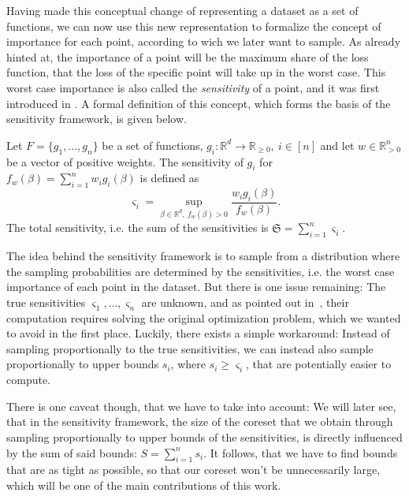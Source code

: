 Having made this conceptual change of representing a dataset as
a set of functions, we can now use this new representation to
formalize the concept of importance for each point, according
to wich we later want to sample.
As already hinted at, the importance of a point will be the
maximum share of the loss function, that the loss of the specific
point will take up in the worst case.
This worst case importance is also called the \textit{sensitivity}
of a point, and it was first introduced in
\cite{langberg-schulman-sensitivities}.
A formal definition of this concept, which forms
the basis of the sensitivity framework, is given below.

\begin{definition}
    \label{def:sensitivity}
    Let $F = \{ g_1, ..., g_n \}$ be a set of functions,
    $g_i: \mathbb{R}^d \rightarrow \mathbb{R}_{\geq 0}, \ i \in [n]$
    and let $w \in \mathbb{R}^n_{>0}$ be a vector of positive weights.
    The sensitivity of $g_i$ for $f_w(\beta) = \sum_{i=1}^n w_i g_i(\beta)$ is defined as
    \begin{equation*}
        \varsigma_i = \sup_{\beta \in \mathbb{R}^d, \ f_w(\beta) > 0} \frac{w_i g_i(\beta)}{f_w(\beta)}.
    \end{equation*}
    The total sensitivity, i.e. the sum of the sensitivities is $\mathfrak{S} = \sum_{i=1}^n \varsigma_i$.
\end{definition}

The idea behind the sensitivity framework is to sample from a
distribution where the sampling probabilities are determined by
the sensitivities, i.e. the worst case importance of each point
in the dataset.
But there is one issue remaining: The true sensitivities
$\varsigma_1, ..., \varsigma_n$ are unknown, and as
pointed out in~\cite{braverman-feldman-coresets}, their
computation requires solving the original optimization problem,
which we wanted to avoid in the first place.
Luckily, there exists a simple workaround:
Instead of sampling proportionally to the true sensitivities,
we can instead also sample proportionally to
upper bounds $s_i$, where $s_i \geq \varsigma_i$, that are
potentially easier to compute.

There is one caveat though, that we have to take into account:
We will later see, that in the sensitivity framework, the
size of the coreset that we obtain through sampling proportionally
to upper bounds of the sensitivities, is directly influenced
by the sum of said bounds: $S = \sum_{i=1}^n s_i$.
It follows, that we have to find bounds that are as tight as
possible, so that our coreset won't be unnecessarily large,
which will be one of the main contributions of this work.

